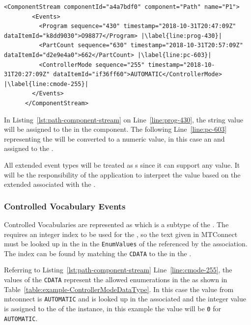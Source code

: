 \begin{lstlisting}[firstnumber=last,escapechar=|,%
    caption={Path Component Stream},label={lst:path-component-stream}]
      <ComponentStream componentId="a4a7bdf0" component="Path" name="P1">
        <Events>
          <Program sequence="430" timestamp="2018-10-31T20:47:09Z" dataItemId="k8dd9030">O98877</Program> |\label{line:prog-430}|
          <PartCount sequence="630" timestamp="2018-10-31T20:57:09Z" dataItemId="d2e9e4a0">662</PartCount> |\label{line:pc-603}|
          <ControllerMode sequence="255" timestamp="2018-10-31T20:27:09Z" dataItemId="if36ff60">AUTOMATIC</ControllerMode> |\label{line:cmode-255}|
        </Events>
      </ComponentStream>
\end{lstlisting}

In Listing~\ref{lst:path-component-stream} on Line~\ref{line:prog-430}, the string value will be assigned to the   in the  component. The following Line~\ref{line:pc-603} representing the  will be converted to a numeric value, in this case an  and assigned to the .

All extended event types will be treated as s since it can support any value. It will be the responsibility of the application to interpret the value based on the extended  associated with the .

\subsubsection{Controlled Vocabulary Events}

Controlled Vocabularies are represented as  which is a subtype of the . The  requires an integer index to be used for the , so the text given in MTConnect must be looked up in the  in the \texttt{EnumValues}  of the  referenced by the  association. The index can be found by matching the \texttt{CDATA} to the  in the .

Referring to Listing~\ref{lst:path-component-stream} Line~\ref{line:cmode-255}, the values of the \texttt{CDATA} represent the allowed enumerations in the  as shown in Table~\ref{table:example-ControllerModeDataType}. In this case the value from mtconnect is \texttt{AUTOMATIC} and is looked up in the associated  and the integer value is assigned to the  of the  instance, in this example the value will be \texttt{0} for \texttt{AUTOMATIC}.

